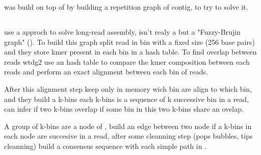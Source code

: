 \documentclass[main]{subfiles}
\begin{document}
\flye was build on top of \abruijn by building a repetition graph of \abruijn contig, to try to solve it.

\subsection{\wtdbg}

\wtdbg use a \DBG approch to solve long-read assembly, isn't realy a \DBG but a "Fuzzy-Brujin graph" (). To build this graph \wtdbg split read in bin with a fixed size (256 base pairs) and they store kmer present in each bin in a hash table.
To find overlap between reads wtdg2 use an hash table to compare the kmer composition between each reads and perform an exact alignment between each bin of reads. 

After this alignment step \wtdbg keep only in memory wich bin are align to which bin, and they build a k-bins each k-bins is a sequence of k successive bin in a read, \wtdbg can infer if two k-bins overlap if some bin in this two k-bins share an ovelap.

A group of k-bins are a node of , \wtdbg build an edge between two node if a k-bins in each node are succesive in a read, after some cleanning step (pops bubbles, tips cleanning) \wtdbg build a consensus sequence with each simple path in .

\end{document}
